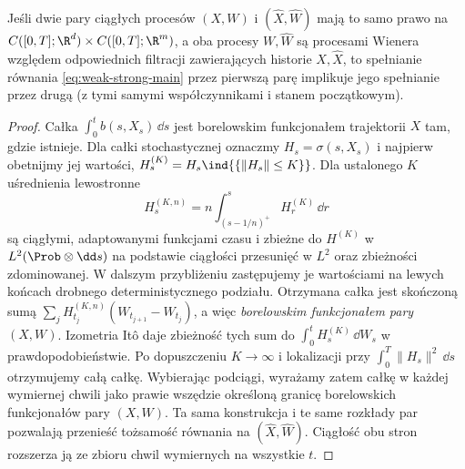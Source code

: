 \begin{lemat}
\label{lem:YW-transfer}
Jeśli dwie pary ciągłych procesów $(X,W)$ i
$(\widehat X,\widehat W)$ mają to samo prawo na
$C([0,T];\R^d)\times C([0,T];\R^m)$, a oba procesy
$W,\widehat W$ są procesami Wienera względem odpowiednich
filtracji zawierających historie $X,\widehat X$, to
spełnianie równania \eqref{eq:weak-strong-main} przez
pierwszą parę implikuje jego spełnianie przez drugą
(z tymi samymi współczynnikami i stanem początkowym).
\end{lemat}
\begin{proof}
Całka $\int_0^t b(s,X_s)\,\dd s$ jest borelowskim
funkcjonałem trajektorii $X$ tam, gdzie istnieje.
Dla całki stochastycznej oznaczmy
$H_s=\sigma(s,X_s)$ i najpierw obetnijmy jej wartości,
$H_s^{(K)}=H_s\ind{\{\|H_s\|\le K\}}$.
Dla ustalonego $K$ uśrednienia lewostronne
\[
 H_s^{(K,n)}=n\int_{(s-1/n)^+}^{s}H_r^{(K)}\,\dd r
\]
są ciągłymi, adaptowanymi funkcjami czasu i zbieżne do
$H^{(K)}$ w $L^2(\Prob\otimes\dd s)$ na podstawie
ciągłości przesunięć w $L^2$ oraz zbieżności zdominowanej.
W dalszym przybliżeniu zastępujemy je wartościami na
lewych końcach drobnego deterministycznego podziału.
Otrzymana całka jest skończoną sumą
$\sum_j H_{t_j}^{(K,n)}(W_{t_{j+1}}-W_{t_j})$,
a więc \emph{borelowskim funkcjonałem pary} $(X,W)$.
Izometria Itô daje zbieżność tych sum do
$\int_0^tH_s^{(K)}\,\dd W_s$ w prawdopodobieństwie.
Po dopuszczeniu $K\to\infty$ i lokalizacji przy
$\int_0^T\|H_s\|^2\,\dd s$ otrzymujemy całą całkę.
Wybierając podciągi, wyrażamy zatem całkę w każdej
wymiernej chwili jako prawie wszędzie określoną granicę
borelowskich funkcjonałów pary $(X,W)$.
Ta sama konstrukcja i te same rozkłady par pozwalają
przenieść tożsamość równania na $(\widehat X,\widehat W)$.
Ciągłość obu stron rozszerza ją ze zbioru chwil wymiernych
na wszystkie $t$.
\end{proof}

